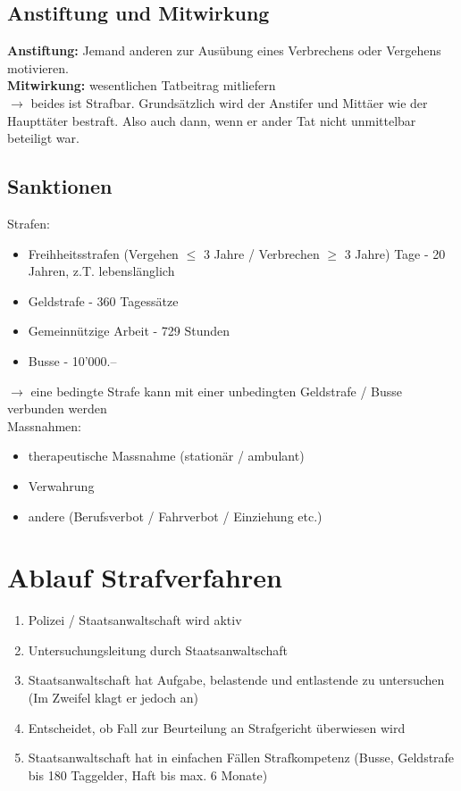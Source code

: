 \documentclass{report}
\theoremstyle{definition}
\theoremstyle{example}
\begin{document}
\subsection{Anstiftung und Mitwirkung}
\textbf{Anstiftung:} Jemand anderen zur Ausübung eines Verbrechens oder Vergehens motivieren.\\
\textbf{Mitwirkung:} wesentlichen Tatbeitrag mitliefern\\
$\rightarrow$ beides ist Strafbar. Grundsätzlich wird der Anstifer und Mittäer wie der Haupttäter bestraft. Also auch dann, wenn er ander Tat nicht unmittelbar beteiligt war.

\subsection{Sanktionen}
Strafen:
\begin{itemize}
   \item Freihheitsstrafen (Vergehen $\leq$ 3 Jahre / Verbrechen $\geq$ 3 Jahre)
    Tage - 20 Jahren, z.T. lebenslänglich 
   \item Geldstrafe
    - 360 Tagessätze 
   \item Gemeinnützige Arbeit
    - 729 Stunden
   \item Busse
    - 10'000.-- 
\end{itemize}
$\rightarrow$ eine bedingte Strafe kann mit einer unbedingten Geldstrafe / Busse verbunden werden\\

Massnahmen:
\begin{itemize}
   \item therapeutische Massnahme (stationär / ambulant)
   \item Verwahrung
   \item andere (Berufsverbot / Fahrverbot / Einziehung etc.)
\end{itemize}

\section{Ablauf Strafverfahren}
\begin{enumerate}
   \item Polizei / Staatsanwaltschaft wird aktiv
   \item Untersuchungsleitung durch Staatsanwaltschaft
   \item Staatsanwaltschaft hat Aufgabe, belastende und entlastende zu untersuchen (Im Zweifel klagt er jedoch an)
   \item Entscheidet, ob Fall zur Beurteilung an Strafgericht überwiesen wird
   \item Staatsanwaltschaft hat in einfachen Fällen Strafkompetenz (Busse, Geldstrafe bis 180 Taggelder, Haft bis max. 6 Monate)
\end{enumerate}
\end{document}
